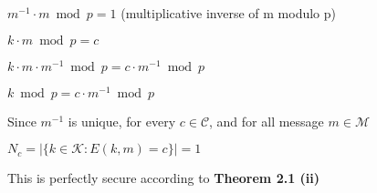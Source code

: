 \begin{tcolorbox}[solutionbox, title=Answer: Perfectly Secure]
    $m^{-1} \cdot m \bmod p = 1$ (multiplicative inverse of m modulo p)
    \vspace{1em}

    $k \cdot m \bmod p = c$

    $k \cdot m \cdot m^{-1} \bmod p = c \cdot m^{-1} \bmod p$

    $k \bmod p = c \cdot m^{-1} \bmod p$

    Since $m^{-1}$ is unique, for every $c \in \mathcal{C}$, and for all message $m \in \mathcal{M}$

    $N_c = |\{k \in \mathcal{K}: E(k,m) = c\}| = 1$

    This is perfectly secure according to \textbf{Theorem 2.1 (ii)}
\end{tcolorbox}




